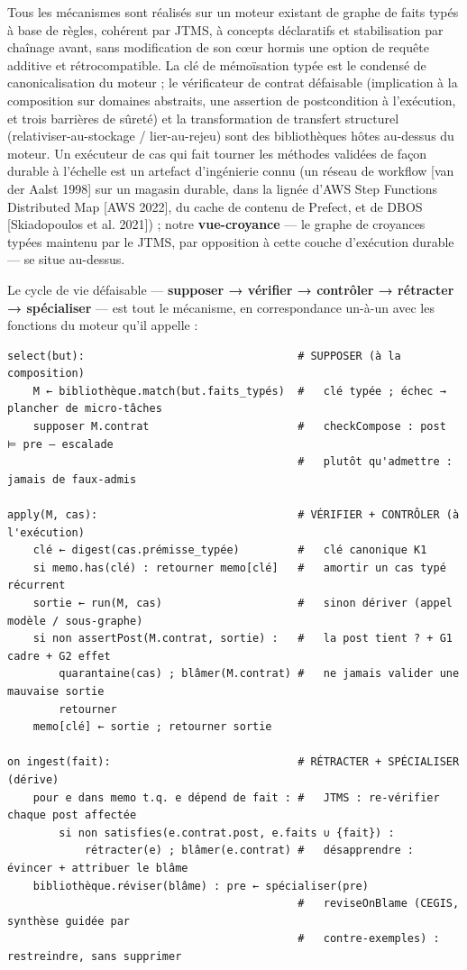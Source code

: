 \documentclass[11pt]{article}
\begin{document}
Tous les mécanismes sont réalisés sur un moteur existant de graphe de faits typés à base de règles, cohérent par JTMS, à concepts déclaratifs et stabilisation par chaînage avant, sans modification de son cœur hormis une option de requête additive et rétrocompatible. La clé de mémoïsation typée est le condensé de canonicalisation du moteur ; le vérificateur de contrat défaisable (implication à la composition sur domaines abstraits, une assertion de postcondition à l'exécution, et trois barrières de sûreté) et la transformation de transfert structurel (relativiser-au-stockage / lier-au-rejeu) sont des bibliothèques hôtes au-dessus du moteur. Un exécuteur de cas qui fait tourner les méthodes validées de façon durable à l'échelle est un artefact d'ingénierie connu (un réseau de workflow [van der Aalst 1998] sur un magasin durable, dans la lignée d'AWS Step Functions Distributed Map [AWS 2022], du cache de contenu de Prefect, et de DBOS [Skiadopoulos et al. 2021]) ; notre \textbf{vue-croyance} — le graphe de croyances typées maintenu par le JTMS, par opposition à cette couche d'exécution durable — se situe au-dessus.

Le cycle de vie défaisable — \textbf{supposer → vérifier → contrôler → rétracter → spécialiser} — est tout le mécanisme, en correspondance un-à-un avec les fonctions du moteur qu'il appelle :

\begin{small}\begin{verbatim}
select(but):                                 # SUPPOSER (à la composition)
    M ← bibliothèque.match(but.faits_typés)  #   clé typée ; échec → plancher de micro-tâches
    supposer M.contrat                       #   checkCompose : post ⊨ pre — escalade
                                             #   plutôt qu'admettre : jamais de faux-admis

apply(M, cas):                               # VÉRIFIER + CONTRÔLER (à l'exécution)
    clé ← digest(cas.prémisse_typée)         #   clé canonique K1
    si memo.has(clé) : retourner memo[clé]   #   amortir un cas typé récurrent
    sortie ← run(M, cas)                     #   sinon dériver (appel modèle / sous-graphe)
    si non assertPost(M.contrat, sortie) :   #   la post tient ? + G1 cadre + G2 effet
        quarantaine(cas) ; blâmer(M.contrat) #   ne jamais valider une mauvaise sortie
        retourner
    memo[clé] ← sortie ; retourner sortie

on ingest(fait):                             # RÉTRACTER + SPÉCIALISER (dérive)
    pour e dans memo t.q. e dépend de fait : #   JTMS : re-vérifier chaque post affectée
        si non satisfies(e.contrat.post, e.faits ∪ {fait}) :
            rétracter(e) ; blâmer(e.contrat) #   désapprendre : évincer + attribuer le blâme
    bibliothèque.réviser(blâme) : pre ← spécialiser(pre)
                                             #   reviseOnBlame (CEGIS, synthèse guidée par
                                             #   contre-exemples) : restreindre, sans supprimer
\end{verbatim}\end{small}
\end{document}
